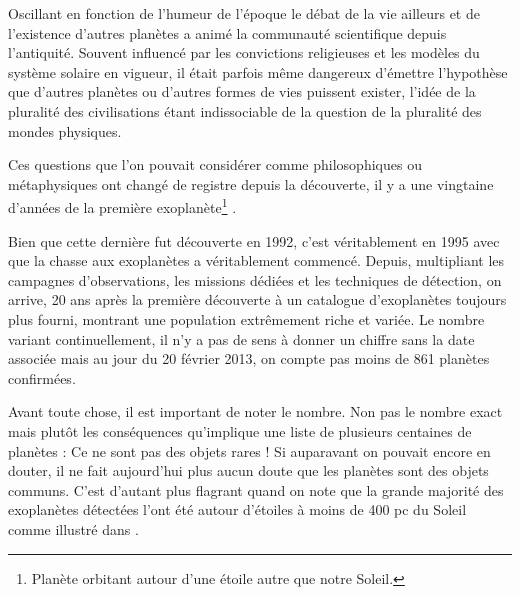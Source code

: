 

Oscillant en fonction de l'humeur de l'époque le débat de la vie ailleurs et de l'existence d'autres planètes a animé la communauté scientifique depuis l'antiquité. Souvent influencé par les convictions religieuses et les modèles du système solaire en vigueur, il était parfois même dangereux d'émettre l'hypothèse que d'autres planètes ou d'autres formes de vies puissent exister, l'idée de la pluralité des civilisations étant indissociable de la question de la pluralité des mondes physiques. %

Ces questions que l'on pouvait considérer comme philosophiques ou métaphysiques ont changé de registre depuis la découverte, il y a une vingtaine d'années de la première exoplanète\footnote{Planète orbitant autour d'une étoile autre que notre Soleil.} \citep{1992Natur.355..145W}.

Bien que cette dernière fut découverte en 1992, c'est véritablement en 1995 avec  \citep{1995Natur.378..355M} que la chasse aux exoplanètes a véritablement commencé. Depuis, multipliant les campagnes d'observations, les missions dédiées et les techniques de détection, on arrive, 20 ans après la première découverte à un catalogue d'exoplanètes toujours plus fourni, montrant une population extrêmement riche et variée. Le nombre variant continuellement, il n'y a pas de sens à donner un chiffre sans la date associée mais au jour du 20 février 2013, on compte pas moins de 861 planètes confirmées. 

Avant toute chose, il est important de noter le nombre. Non pas le nombre exact mais plutôt les conséquences qu'implique une liste de plusieurs centaines de planètes : Ce ne sont pas des objets rares ! Si auparavant on pouvait encore en douter, il ne fait aujourd'hui plus aucun doute que les planètes sont des objets communs. C'est d'autant plus flagrant quand on note que la grande majorité des exoplanètes détectées l'ont été autour d'étoiles à moins de 400 pc du Soleil comme illustré dans . 

